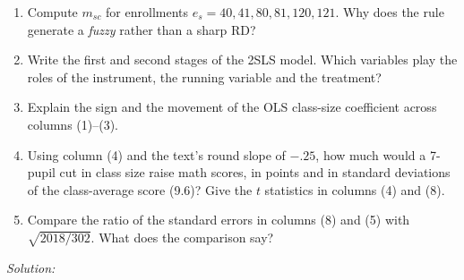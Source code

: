 \documentclass[11pt,a4paper]{article}
\newif\ifsolucoes
\newcommand{\espacoresol}{4.5cm}   %
\newcommand{\resolespaco}{\ifsolucoes\else\par\textit{Solution:}\vspace{\espacoresol}\par\fi}
\begin{document}
\begin{enumerate}[label=(\alph*)]
\item Compute $m_{sc}$ for enrollments $e_s=40,41,80,81,120,121$. Why does the rule generate a
\emph{fuzzy} rather than a sharp RD?
\item Write the first and second stages of the 2SLS model. Which variables play the roles of the
instrument, the running variable and the treatment?
\item Explain the sign and the movement of the OLS class-size coefficient across columns (1)--(3).
\item Using column (4) and the text's round slope of $-.25$, how much would a 7-pupil cut in class size
raise math scores, in points and in standard deviations of the class-average score (9.6)? Give the $t$
statistics in columns (4) and (8).
\item Compare the ratio of the standard errors in columns (8) and (5) with $\sqrt{2018/302}$. What does the
comparison say?
\end{enumerate}
\resolespaco
\end{document}
